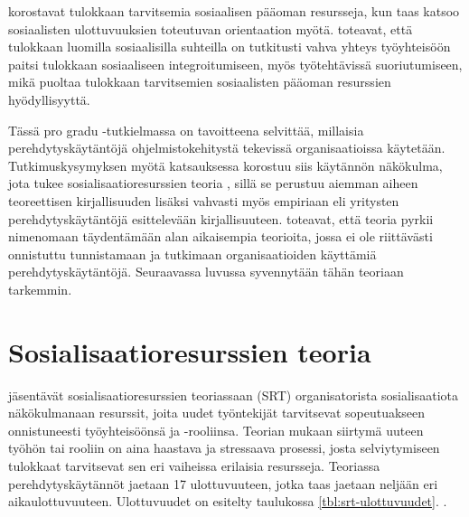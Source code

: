 \documentclass[utf8]{gradu3}
\begin{document}
\textcite{saks-gruman-2012} korostavat tulokkaan tarvitsemia sosiaalisen pääoman resursseja, kun taas \textcite{bauer-2010} katsoo sosiaalisten ulottuvuuksien toteutuvan orientaation myötä. \textcite{zhao-ym-2022} toteavat, että tulokkaan luomilla sosiaalisilla suhteilla on tutkitusti vahva yhteys työyhteisöön paitsi tulokkaan sosiaaliseen integroitumiseen, myös työtehtävissä suoriutumiseen, mikä puoltaa tulokkaan tarvitsemien sosiaalisten pääoman resurssien hyödyllisyyttä.

Tässä pro gradu -tutkielmassa on tavoitteena selvittää, millaisia perehdytyskäytäntöjä ohjelmistokehitystä tekevissä organisaatioissa käytetään. Tutkimuskysymyksen myötä katsauksessa korostuu siis käytännön näkökulma, jota tukee sosialisaatioresurssien teoria \parencite{saks-gruman-2012}, sillä se perustuu aiemman aiheen teoreettisen kirjallisuuden lisäksi vahvasti myös empiriaan eli yritysten perehdytyskäytäntöjä esittelevään kirjallisuuteen. \textcite{saks-gruman-2012} toteavat, että teoria pyrkii nimenomaan täydentämään alan aikaisempia teorioita, jossa ei ole riittävästi onnistuttu tunnistamaan ja tutkimaan organisaatioiden käyttämiä perehdytyskäytäntöjä. Seuraavassa luvussa syvennytään tähän teoriaan tarkemmin.

\section{Sosialisaatioresurssien teoria}
\label{luku-SRT-teoria}

\textcite{saks-gruman-2012} jäsentävät sosialisaatioresurssien teoriassaan (SRT) organisatorista sosialisaatiota näkökulmanaan resurssit, joita uudet työntekijät tarvitsevat sopeutuakseen onnistuneesti työyhteisöönsä ja -rooliinsa. Teorian mukaan siirtymä uuteen työhön tai rooliin on aina haastava ja stressaava prosessi, josta selviytymiseen tulokkaat tarvitsevat sen eri vaiheissa erilaisia resursseja. Teoriassa perehdytyskäytännöt jaetaan 17 ulottuvuuteen, jotka taas jaetaan neljään eri aikaulottuvuuteen. Ulottuvuudet on esitelty taulukossa \ref{tbl:srt-ulottuvuudet}. \parencite{saks-gruman-2012}.
\end{document}

